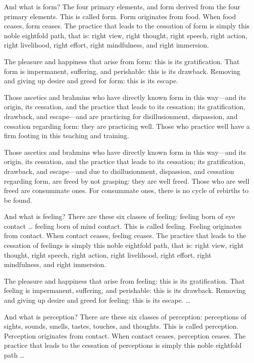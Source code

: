 \documentclass[12pt,openany]{book}%
\begin{document}
And what is form? The four primary elements, and form derived from the four primary elements. This is called form. Form originates from food. When food ceases, form ceases. The practice that leads to the cessation of form is simply this noble eightfold path, that is: right view, right thought, right speech, right action, right livelihood, right effort, right mindfulness, and right immersion. 

The pleasure and happiness that arise from form: this is its gratification. That form is impermanent, suffering, and perishable: this is its drawback. Removing and giving up desire and greed for form: this is its escape. 

Those ascetics and brahmins who have directly known form in this way—and its origin, its cessation, and the practice that leads to its cessation; its gratification, drawback, and escape—and are practicing for disillusionment, dispassion, and cessation regarding form: they are practicing well. Those who practice well have a firm footing in this teaching and training. 

Those ascetics and brahmins who have directly known form in this way—and its origin, its cessation, and the practice that leads to its cessation; its gratification, drawback, and escape—and due to disillusionment, dispassion, and cessation regarding form, are freed by not grasping: they are well freed. Those who are well freed are consummate ones. For consummate ones, there is no cycle of rebirths to be found. 

And what is feeling? There are these six classes of feeling: feeling born of eye contact … feeling born of mind contact. This is called feeling. Feeling originates from contact. When contact ceases, feeling ceases. The practice that leads to the cessation of feelings is simply this noble eightfold path, that is: right view, right thought, right speech, right action, right livelihood, right effort, right mindfulness, and right immersion. 

The pleasure and happiness that arise from feeling: this is its gratification. That feeling is impermanent, suffering, and perishable: this is its drawback. Removing and giving up desire and greed for feeling: this is its escape. … 

And what is perception? There are these six classes of perception: perceptions of sights, sounds, smells, tastes, touches, and thoughts. This is called perception. Perception originates from contact. When contact ceases, perception ceases. The practice that leads to the cessation of perceptions is simply this noble eightfold path … 
\end{document}
